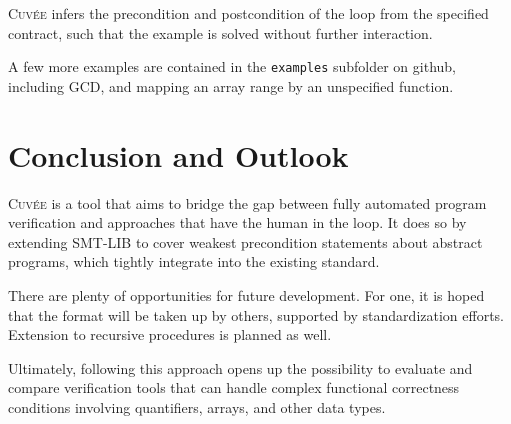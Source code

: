 \documentclass[fleqn]{llncs}
\newcommand{\Cuvee}{\textsc{Cuvée}\xspace}
\newcommand{\code}[1]{\texttt{#1}}
\begin{document}
\Cuvee infers the precondition and postcondition of the loop from the
specified contract, such that the example is solved without further interaction.

A few more examples are contained in the \code{examples} subfolder on github,
including GCD, and mapping an array range by an unspecified function.

\section{Conclusion and Outlook}

\Cuvee is a tool that aims to bridge the gap between fully automated program verification
and approaches that have the human in the loop.
It does so by extending SMT-LIB to cover weakest precondition statements about abstract programs,
which tightly integrate into the existing standard.

There are plenty of opportunities for future development.
For one, it is hoped that the format will be taken up by others,
supported by standardization efforts.
Extension to recursive procedures is planned as well.

Ultimately, following this approach opens up the possibility to evaluate and compare
verification tools that can handle complex functional correctness conditions
involving quantifiers, arrays, and other data types.



\end{document}

